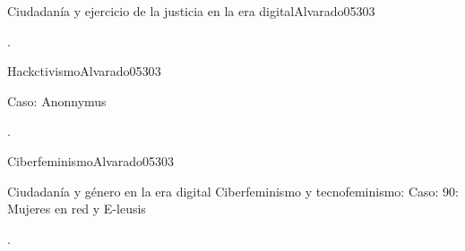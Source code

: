 \begin{syllabus}
\begin{unit}{}{ Ciudadanía y ejercicio de la justicia en la era digital}{Alvarado05}{30}{3}
   \begin{learningoutcomes}
      \item .
   \end{learningoutcomes}
\end{unit}

\begin{unit}{}{ Hackctivismo}{Alvarado05}{30}{3}
   \begin{topics}
      \item Caso: Anonnymus
   \end{topics}

   \begin{learningoutcomes}
      \item .
   \end{learningoutcomes}
\end{unit}

\begin{unit}{}{Ciberfeminismo}{Alvarado05}{30}{3}
   \begin{topics}
      \item Ciudadanía y género en la era digital Ciberfeminismo y tecnofeminismo:  Caso: 90: Mujeres en red y E-leusis

   \end{topics}

   \begin{learningoutcomes}
      \item .
   \end{learningoutcomes}
\end{unit}



\begin{coursebibliography}
\end{coursebibliography}

\end{syllabus}
